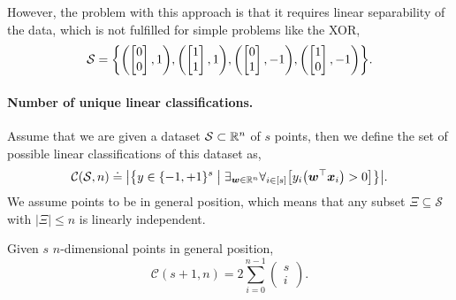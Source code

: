 However, the problem with this approach is that it requires linear separability of the data, which
is not fulfilled for simple problems like the XOR, \[
    \mathcal{S} = \lft\{ \lft( \begin{bmatrix} 0 \\ 0 \end{bmatrix},1 \rgt), \lft( \begin{bmatrix} 1 \\ 1 \end{bmatrix},1 \rgt), \lft( \begin{bmatrix} 0 \\ 1 \end{bmatrix},-1 \rgt), \lft( \begin{bmatrix} 1 \\ 0 \end{bmatrix},-1 \rgt) \rgt\}.
\]

\paragraph{Number of unique linear classifications.} Assume that we are given a dataset $\mathcal{S} \subset \mathbb{R}^n$ of $s$ points, then we define the set
of possible linear classifications of this dataset as, \[
    \mathcal{C}(\mathcal{S}, n) \doteq \lft| \lft\{ y\in \{ -1, +1 \}^s \;\middle|\; \exists_{\vec{w} \in \R^n} \forall_{i \in [s]} \lft[y_i \lft( \transpose{\vec{w}} \vec{x}_i \rgt) > 0\rgt] \rgt\} \rgt|.
\]
We assume points to be in general position, which means that any subset $\Xi \subseteq \mathcal{S}$
with $|\Xi| \leq n$ is linearly independent.

\begin{theorem}
    Given $s$ $n$-dimensional points in general position, \[
        \mathcal{C}(s+1, n) = 2 \sum_{i=0}^{n-1} \begin{pmatrix} s \\ i \end{pmatrix}.
    \]
\end{theorem}

